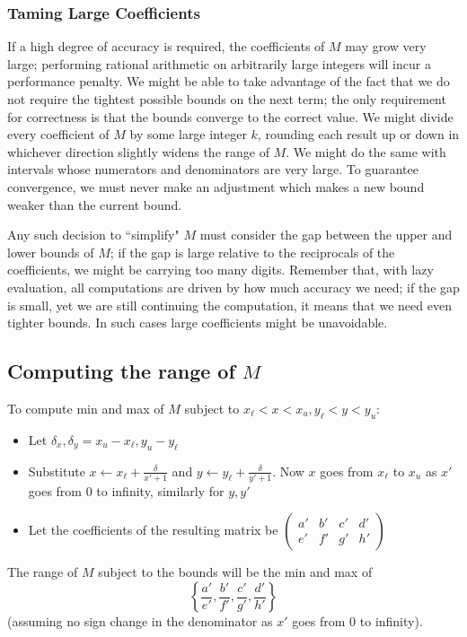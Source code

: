 \documentclass[11pt, oneside]{amsart}   	%
\newcommand{\bihomographic}[8]{\left(\begin{smallmatrix}#1&#2&#3&#4\\#5&#6&#7&#8\end{smallmatrix}\right)}
\begin{document}
\subsubsection{Taming Large Coefficients}
If a high degree of accuracy is required, the coefficients of $M$ may grow very large; performing rational arithmetic on arbitrarily
large integers will incur a performance penalty. We might be able to take advantage of the fact that we do not require the tightest
possible bounds on the next term; the only requirement for correctness is that the bounds converge to the correct value. We might
divide every coefficient of $M$ by some large integer $k$, rounding each result up or down in whichever direction slightly widens the
range of $M$. We might do the same with intervals whose numerators and denominators are very large. To guarantee convergence,
we must never make an adjustment which makes a new bound weaker than the current bound.

Any such decision to ``simplify" $M$ must consider the gap between the upper and lower bounds of $M$; if the gap is large relative
to the reciprocals of the coefficients, we might be carrying too many digits. Remember that, with lazy evaluation, all computations
are driven by how much accuracy we need; if the gap is small, yet we are still continuing the computation, it means that we need
even tighter bounds. In such cases large coefficients might be unavoidable.


\subsection{Computing the range of $M$}\label{sec:ComputeBounds}
To compute min and max of $M$ subject to $x_{\ell} < x < x_u, y_{\ell} < y < y_u$:
\begin{itemize}
\item Let $\delta_x, \delta_y = x_u - x_{\ell}, y_u - y_{\ell}$
\item Substitute $x \leftarrow x_{\ell} + \frac{\delta}{x'+1}$ and $y \leftarrow y_{\ell} + \frac{\delta}{y'+1}$.
Now $x$ goes from $x_{\ell}$ to $x_u$ as $x'$ goes from 0 to infinity, similarly for $y,y'$
\item Let the coefficients of the resulting matrix be $\bihomographic{a'}{b'}{c'}{d'}{e'}{f'}{g'}{h'}$
\end{itemize}
The range of $M$ subject to the bounds will be the min and max of 
\[
\left\{ \frac{a'}{e'},\frac{b'}{f'},\frac{c'}{g'},\frac{d'}{h'} \right\}
\]
(assuming no sign change in the denominator as $x'$ goes from 0 to infinity).
\end{document}
